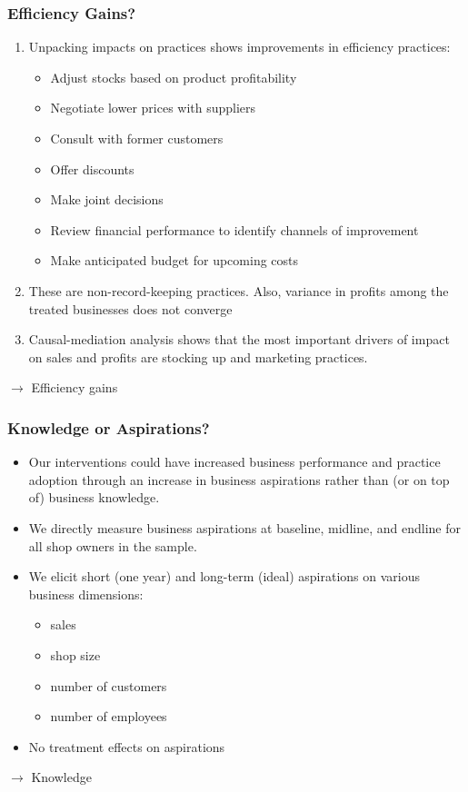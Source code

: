\documentclass[10pt]{beamer}
\begin{document}
\begin{frame}
\frametitle{Efficiency Gains?}
\begin{enumerate}
\item Unpacking impacts on practices shows improvements in efficiency practices:
\vspace{0.1in}
\begin{itemize}
\item Adjust stocks based on product profitability
\item Negotiate lower prices with suppliers
\item Consult with former customers
\item Offer discounts
\item Make joint decisions
\item Review financial performance to identify channels of improvement
\item Make anticipated budget for upcoming costs
\end{itemize}
\vspace{0.2in}
\pause
\item These are non-record-keeping practices. Also, variance in profits among the treated businesses does not converge
\vspace{0.2in}
\pause
\item Causal-mediation analysis shows that the most important drivers of impact on sales and profits are stocking up and marketing practices.
\end{enumerate}
\vspace{0.2in}
$\rightarrow$ \textcolor[rgb]{0.00,0.07,1.00}{Efficiency gains}
\end{frame}

\begin{frame}
\frametitle{Knowledge or Aspirations?}
\begin{itemize}
\item Our interventions could have increased business performance and practice adoption through an increase in business aspirations rather than (or on top of) business knowledge.
\vspace{0.2in}
\item We directly measure business aspirations at baseline, midline, and endline for all shop owners in the sample.
\vspace{0.2in}
\item We elicit short (one year) and long-term (ideal) aspirations on various business dimensions:
\vspace{0.1in}
    \begin{itemize}
    \item sales
    \item shop size
    \item number of customers
    \item number of employees
    \end{itemize}
\vspace{0.2in}
\item No treatment effects on aspirations
\vspace{0.2in}
\end{itemize}
$\rightarrow$ \textcolor[rgb]{0.00,0.07,1.00}{Knowledge}
\end{frame}
\end{document}
